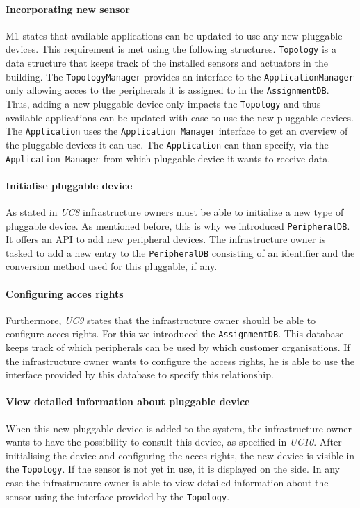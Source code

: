 \documentclass[english]{sareport}
\begin{document}
\paragraph{Incorporating new sensor}
M1 states that available applications can be updated to use any new pluggable devices. This requirement is met using the following structures. \texttt{Topology} is a data structure that keeps track of the installed sensors and actuators in the building. The \texttt{TopologyManager} provides an interface to the \texttt{ApplicationManager} only allowing acces to the peripherals it is assigned to in the \texttt{AssignmentDB}. Thus, adding a new pluggable device only impacts the \texttt{Topology} and thus available applications can be updated with ease to use the new pluggable devices. The \texttt{Application} uses the \texttt{Application Manager} interface to get an overview of the pluggable devices it can use. The \texttt{Application} can than specify, via the \texttt{Application Manager} from which pluggable device it wants to receive data.

\paragraph{Initialise pluggable device}
As stated in \emph{UC8} infrastructure owners must be able to initialize a new type of pluggable device. As mentioned before, this is why we introduced \texttt{PeripheralDB}. It offers an API to add new peripheral devices. The infrastructure owner is tasked to add a new entry to the \texttt{PeripheralDB} consisting of an identifier and the conversion method used for this pluggable, if any.

\paragraph{Configuring acces rights}
Furthermore, \emph{UC9} states that the infrastructure owner should be able to configure acces rights. For this we introduced the \texttt{AssignmentDB}. This database keeps track of which peripherals can be used by which customer organisations. If the infrastructure owner wants to configure the access rights, he is able to use the interface provided by this database to specify this relationship.

\paragraph{View detailed information about pluggable device}
When this new pluggable device is added to the system, the infrastructure owner wants to have the possibility to consult this device, as specified in \emph{UC10}. After initialising the device and configuring the acces rights, the new device is visible in the \texttt{Topology}. If the sensor is not yet in use, it is displayed on the side. In any case the infrastructure owner is able to view detailed information about the sensor using the interface provided by the \texttt{Topology}.
\end{document}

